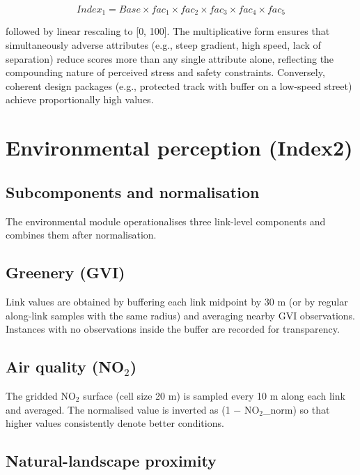\documentclass[
  12pt,
  oneside]{book}
\begin{document}
\[Index_{1} = Base \times fac_{1} \times fac_{2} \times fac_{3} \times fac_{4} \times fac_{5}\]

followed by linear rescaling to {[}0, 100{]}. The multiplicative form ensures that simultaneously adverse attributes (e.g., steep gradient, high speed, lack of separation) reduce scores more than any single attribute alone, reflecting the compounding nature of perceived stress and safety constraints. Conversely, coherent design packages (e.g., protected track with buffer on a low-speed street) achieve proportionally high values.

\section{Environmental perception (Index2)}\label{environmental-perception-index2}

\subsection{Subcomponents and normalisation}\label{subcomponents-and-normalisation}

The environmental module operationalises three link-level components and combines them after normalisation.

\subsection{Greenery (GVI)}\label{greenery-gvi}

Link values are obtained by buffering each link midpoint by 30 m (or by regular along-link samples with the same radius) and averaging nearby GVI observations. Instances with no observations inside the buffer are recorded for transparency.

\subsection{\texorpdfstring{Air quality (NO\(_2\))}{Air quality (NO\_2)}}\label{air-quality-no_2}

The gridded NO\(_2\) surface (cell size 20 m) is sampled every 10 m along each link and averaged. The normalised value is inverted as (1 − NO\(_2\)\_norm) so that higher values consistently denote better conditions.

\subsection{Natural-landscape proximity}\label{natural-landscape-proximity}
\end{document}
